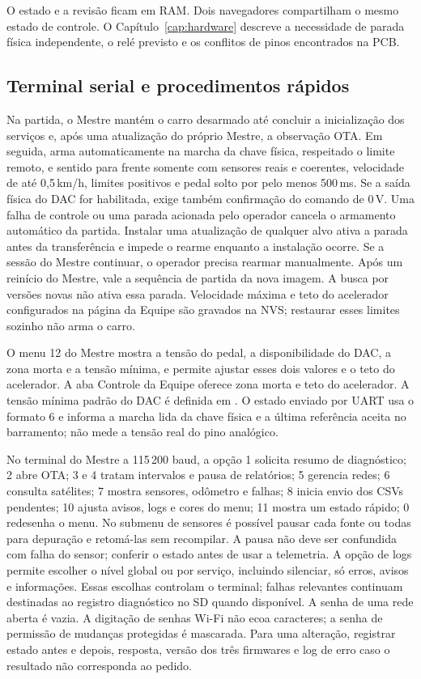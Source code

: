O estado e a revisão ficam em RAM. Dois navegadores compartilham o mesmo estado de controle. O Capítulo~\ref{cap:hardware} descreve a necessidade de parada física independente, o relé previsto e os conflitos de pinos encontrados na PCB.

\subsection{Terminal serial e procedimentos rápidos}
Na partida, o Mestre mantém o carro desarmado até concluir a inicialização
dos serviços e, após uma atualização do próprio Mestre, a observação OTA.
Em seguida, arma automaticamente na marcha da chave física, respeitado o limite remoto, e sentido para frente somente
com sensores reais e coerentes, velocidade de até 0,5\,km/h, limites positivos
e pedal solto por pelo menos 500\,ms. Se a saída física do DAC for habilitada,
exige também confirmação do comando de 0\,V. Uma falha de controle ou uma
parada acionada pelo operador cancela o armamento automático da partida.
Instalar uma atualização de qualquer alvo ativa a parada antes da transferência
e impede o rearme enquanto a instalação ocorre. Se a sessão do Mestre continuar,
o operador precisa rearmar manualmente. Após um reinício do Mestre, vale a
sequência de partida da nova imagem. A busca por versões novas não ativa essa
parada. Velocidade máxima e teto do acelerador configurados na
página da Equipe são gravados na NVS; restaurar esses limites sozinho não arma o carro.

O menu 12 do Mestre mostra a tensão do pedal, a disponibilidade do DAC, a zona morta e a tensão mínima, e permite ajustar esses dois valores e o teto do acelerador. A aba Controle da Equipe oferece zona morta e teto do acelerador. A tensão mínima padrão do DAC é definida em . O estado enviado por UART usa o formato 6 e informa a marcha lida da chave física e a última referência aceita no barramento; não mede a tensão real do pino analógico.

No terminal do Mestre a 115\,200 baud, a opção 1 solicita resumo de diagnóstico; 2 abre OTA; 3 e 4 tratam intervalos e pausa de relatórios; 5 gerencia redes; 6 consulta satélites; 7 mostra sensores, odômetro e falhas; 8 inicia envio dos CSVs pendentes; 10 ajusta avisos, logs e cores do menu; 11 mostra um estado rápido; 0 redesenha o menu. No submenu de sensores é possível pausar cada fonte ou todas para depuração e retomá-las sem recompilar. A pausa não deve ser confundida com falha do sensor; conferir o estado antes de usar a telemetria. A opção de logs permite escolher o nível global ou por serviço, incluindo silenciar, só erros, avisos e informações. Essas escolhas controlam o terminal; falhas relevantes continuam destinadas ao registro diagnóstico no SD quando disponível. A senha de uma rede aberta é vazia. A digitação de senhas Wi-Fi não ecoa caracteres; a senha de permissão de mudanças protegidas é mascarada. Para uma alteração, registrar estado antes e depois, resposta, versão dos três firmwares e log de erro caso o resultado não corresponda ao pedido.
